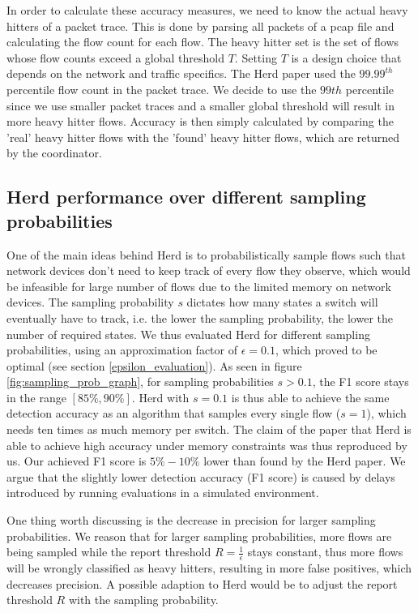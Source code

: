 \documentclass[11pt,oneside,a4paper]{article}
\begin{document}
In order to calculate these accuracy measures, we need to know the actual heavy hitters of a packet trace. This is done by parsing all packets of a pcap file and calculating the flow count for each flow. The heavy hitter set is the set of flows whose flow counts exceed a global threshold $T$. Setting $T$ is a design choice that depends on the network and traffic specifics. The Herd paper used the $99.99^{th}$ percentile flow count in the packet trace. We decide to use the $99th$ percentile since we use smaller packet traces and a smaller global threshold will result in more heavy hitter flows. Accuracy is then simply calculated by comparing the 'real' heavy hitter flows with the 'found' heavy hitter flows, which are returned by the coordinator.

\subsection{Herd performance over different sampling probabilities} \label{sampling_probability_evaluation}

One of the main ideas behind Herd is to probabilistically sample flows such that network devices don't need to keep track of every flow they observe, which would be infeasible for large number of flows due to the limited memory on network devices. The sampling probability $s$ dictates how many states a switch will eventually have to track, i.e. the lower the sampling probability, the lower the number of required states. We thus evaluated Herd for different sampling probabilities, using an approximation factor of $\epsilon = 0.1$, which proved to be optimal (see section \ref{epsilon_evaluation}). As seen in figure \ref{fig:sampling_prob_graph}, for sampling probabilities $s > 0.1$, the F1 score stays in the range $[85\%, 90\%]$. Herd with $s = 0.1$ is thus able to achieve the same detection accuracy as an algorithm that samples every single flow ($s = 1$), which needs ten times as much memory per switch. The claim of the paper that Herd is able to achieve high accuracy under memory constraints was thus reproduced by us. Our achieved F1 score is $5\% - 10\%$ lower than found by the Herd paper. We argue that the slightly lower detection accuracy (F1 score) is caused by delays introduced by running evaluations in a simulated environment.

One thing worth discussing is the decrease in precision for larger sampling probabilities. We reason that for larger sampling probabilities, more flows are being sampled while the report threshold $R = \frac{1}{\epsilon}$ stays constant, thus more flows will be wrongly classified as heavy hitters, resulting in more false positives, which decreases precision. A possible adaption to Herd would be to adjust the report threshold $R$ with the sampling probability.
\end{document}

